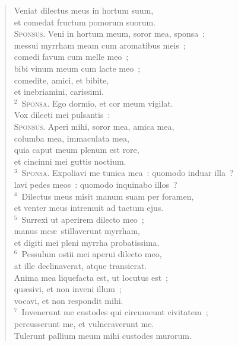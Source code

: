 \begin{flushleft}\begin{verse}\vspace{-19pt}Veniat dilectus meus in hortum suum,\\ et comedat fructum pomorum suorum.\\ \textsc{Sponsus.} Veni in hortum meum, soror mea, sponsa~;\\ messui myrrham meam cum aromatibus meis~;\\ comedi favum cum melle meo~;\\ bibi vinum meum cum lacte meo~;\\ comedite, amici, et bibite,\\ et inebriamini, carissimi.\\
${}^{2}$~\textsc{Sponsa.} Ego dormio, et cor meum vigilat.\\ Vox dilecti mei pulsantis~:\\ \textsc{Sponsus.} Aperi mihi, soror mea, amica mea,\\ columba mea, immaculata mea,\\ quia caput meum plenum est rore,\\ et cincinni mei guttis noctium.\\
${}^{3}$~\textsc{Sponsa.} Expoliavi me tunica mea~: quomodo induar illa~?\\ lavi pedes meos~: quomodo inquinabo illos~?\\
${}^{4}$~Dilectus meus misit manum suam per foramen,\\ et venter meus intremuit ad tactum ejus.\\
${}^{5}$~Surrexi ut aperirem dilecto meo~;\\ manus me\ae\ stillaverunt myrrham,\\ et digiti mei pleni myrrha probatissima.\\
${}^{6}$~Pessulum ostii mei aperui dilecto meo,\\ at ille declinaverat, atque transierat.\\ Anima mea liquefacta est, ut locutus est~;\\ qu\ae sivi, et non inveni illum~;\\ vocavi, et non respondit mihi.\\
${}^{7}$~Invenerunt me custodes qui circumeunt civitatem~;\\ percusserunt me, et vulneraverunt me.\\ Tulerunt pallium meum mihi custodes murorum.\\

\end{verse}
\end{flushleft}
